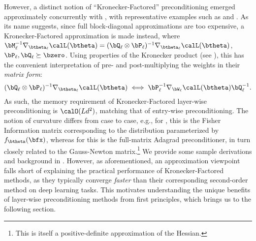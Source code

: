 However, a distinct notion of ``Kronecker-Factored'' preconditioning emerged approximately concurrently with \Adam, with representative examples such as \KFAC and \Shampoo. As its name suggests, since full block-diagonal approximations are too expensive, a Kronecker-Factored approximation is made instead, where $\bM_\ell^{-1} \nabla_{\btheta_\ell} \calL(\btheta) = (\bQ_\ell \otimes \bP_\ell)^{-1}  \nabla_{\btheta_\ell} \calL(\btheta)$, $\bP_\ell, \bQ_\ell \succeq \bzero$. Using properties of the Kronecker product (see ), this has the convenient interpretation of pre- and post-multiplying the weights in their \textit{matrix form}:
\begin{align}\label{eq:kf_precond}
    (\bQ_\ell \otimes \bP_\ell)^{-1}  \nabla_{\btheta_\ell} \calL(\btheta) \iff \bP_\ell^{-1}  \nabla_{\bW_\ell} \calL(\btheta) \bQ_\ell^{-1}.
\end{align}
As such, the memory requirement of Kronecker-Factored layer-wise preconditioning is $\calO(Ld^2)$, matching that of entry-wise preconditioning.
The notion of curvature differs from case to case, e.g., for \KFAC, this is the Fisher Information matrix corresponding to the distribution parameterized by $f_{\btheta}(\bfx)$, whereas for \Shampoo this is the full-matrix Adagrad preconditioner, in turn closely related to the Gauss-Newton matrix.\footnote{This is itself a positive-definite approximation of the Hessian.} We provide some sample derivations and background in . However, as aforementioned, an approximation viewpoint falls short of explaining the practical performance of Kronecker-Factored methods, 
as they typically converge \textit{faster} than their corresponding second-order method \citep{benzing2022gradient} on deep learning tasks.
This motivates understanding the unique benefits of layer-wise preconditioning methods from first principles, which brings us to the following section.











